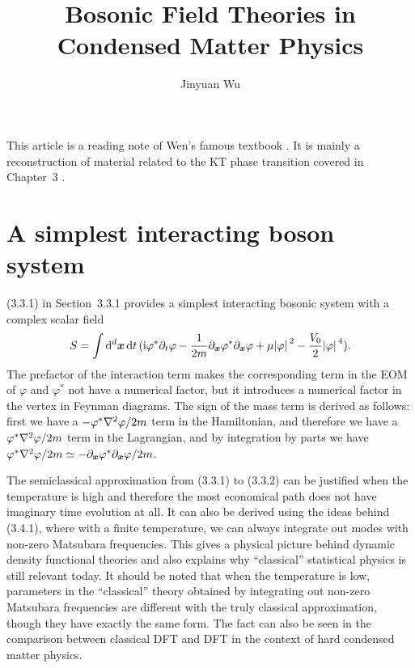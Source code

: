 \documentclass[hyperref, a4paper]{article}
\title{Bosonic Field Theories in Condensed Matter Physics}
\author{Jinyuan Wu}
\newcommand*{\ii}{\mathrm{i}}
\begin{document}
\maketitle

This article is a reading note of Wen's famous textbook \cite{Wen2007}. 
It is mainly a reconstruction of material related to the KT phase transition covered in Chapter~3 . 

\section{A simplest interacting boson system}

(3.3.1) in Section~3.3.1 provides a simplest interacting bosonic system with a complex scalar field 
\begin{equation}
    S = \int \dd[d]{\vb*{x}} \dd{t} (\ii \varphi^* \partial_t \varphi - \frac{1}{2m} \partial_{\vb*{x}} \varphi^* \partial_{\vb*{x}} \varphi + \mu \abs*{\varphi}^2 - \frac{V_0}{2} \abs*{\varphi}^4).
    \label{eq:bosonic}
\end{equation}
The prefactor of the interaction term makes the corresponding term in the EOM of $\varphi$ and $\varphi^*$ not 
have a numerical factor, but it introduces a numerical factor in the vertex in Feynman diagrams. The sign of 
the mass term is derived as follows: first we have a $- \varphi^* \laplacian \varphi / 2m$ term in the 
Hamiltonian, and therefore we have a $\varphi^* \laplacian \varphi / 2m$ term in the Lagrangian, and by 
integration by parts we have $\varphi^* \laplacian \varphi / 2m \simeq - \partial_{\vb*{x}} \varphi^* 
\partial_{\vb*{x}} \varphi / 2m$. 

The semiclassical approximation from (3.3.1) to (3.3.2) can be justified when the temperature is high 
and therefore the most economical path does not have imaginary time evolution at all. It can also 
be derived using the ideas behind (3.4.1), where with a finite temperature, we can always integrate 
out modes with non-zero Matsubara frequencies. This gives a physical picture behind dynamic density 
functional theories and also explains why ``classical'' statistical physics is still relevant today.
It should be noted that when the temperature is low, parameters in the ``classical'' theory obtained 
by integrating out non-zero Matsubara frequencies are different with the truly classical approximation,
though they have exactly the same form. The fact can also be seen in the comparison between classical DFT 
and DFT in the context of hard condensed matter physics. 
\end{document}
